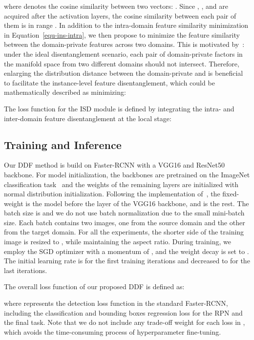 \documentclass[journal]{IEEEtran}
\begin{document}
where  denotes the cosine similarity between two vectors: . Since , ,  and  are acquired after the  activation layers, the cosine similarity between each pair of them is in range . In addition to the intra-domain feature similarity minimization in Equation~\ref{equ-ins-intra}, we then propose to minimize the feature similarity between the domain-private features across two domains. This is motivated by~\cite{chattopadhyay2020learning}: under the ideal disentanglement scenario, each pair of domain-private factors in the manifold space from two different domains should not intersect. Therefore, enlarging the distribution distance between the domain-private  and  is beneficial to facilitate the instance-level feature disentanglement, which could be mathematically described as minimizing:




The loss function for the ISD module is defined by integrating the intra- and inter-domain feature disentanglement at the local stage:




\subsection{Training and Inference\label{sec-imp}}


Our DDF method is build on Faster-RCNN with a VGG16 and ResNet50 backbone. For model initialization, the backbones are pretrained on the ImageNet classification task~\cite{deng2009imagenet} and the weights of the remaining layers are initialized with normal distribution initialization. Following the implementation of~\cite{saito2019strong,chen2020harmonizing,xu2020cross}, the fixed-weight  is the model before the  layer of the VGG16 backbone, and  is the rest. The batch size is  and we do not use batch normalization due to the small mini-batch size. Each batch contains two images, one from the source domain and the other from the target domain. For all the experiments, the shorter side of the training image is resized to , while maintaining the aspect ratio. During training, we employ the SGD optimizer with a momentum of , and the weight decay is set to . The initial learning rate is  for the first  training iterations and decreased to  for the last  iterations. 


The overall loss function of our proposed DDF is defined as:


where  represents the detection loss function in the standard Faster-RCNN, including the classification and bounding boxes regression loss for the RPN and the final task. Note that we do not include any trade-off weight for each loss in , which avoids the time-consuming process of hyperparameter fine-tuning. {}
\end{document}
